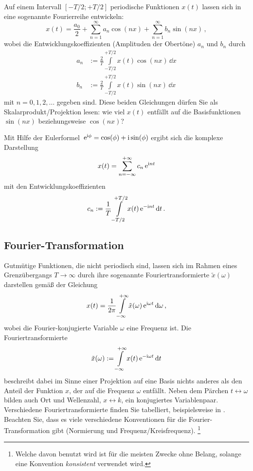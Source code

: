\documentclass[paper=a4, fontsize=11.0pt, abstractoff, DIV12]{scrartcl}
\begin{document}
Auf einem Intervall $[-T/2; +T/2]$ periodische Funktionen $x(t)$
lassen sich in eine sogenannte Fourierreihe entwickeln:
\begin{equation}
x(t) = \frac{a_0}{2}+\sum\limits_{n=1}^{\infty}a_n\cos(nx) + \sum\limits_{n=1}^{\infty}b_n\sin(nx)\,,
\end{equation}
wobei die Entwicklungskoeffizienten (Amplituden der \glqq Obertöne\grqq)
$a_n$ und $b_n$ durch
\begin{align}
a_n &:= \frac{2}{T}\int\limits_{-T/2}^{+T/2}x(t)\cos(nx)\,\dd x\\
b_n &:= \frac{2}{T}\int\limits_{-T/2}^{+T/2}x(t)\sin(nx)\,\dd x
\end{align}
mit $n=0,1,2,\dots$ gegeben sind. Diese beiden Gleichungen dürfen Sie als
Skalarprodukt/Projektion lesen: \glqq wie viel $x(t)$ entfällt auf die
Basisfunktionen $\sin(nx)$ beziehungsweise $\cos(nx)$?\grqq

Mit Hilfe der Eulerformel $\,{\mathrm{e}}^{\mathrm{i}\phi}=\cos(\phi)+\mathrm{i}\sin(\phi)$ ergibt
sich die komplexe Darstellung
\begin{equation}
x(t) = \sum\limits_{n=-\infty}^{+\infty}c_n\,{\mathrm{e}}^{\mathrm{i} n t}
\end{equation}
mit den Entwicklungskoeffizienten
\begin{equation}
c_n := \frac{1}{T}\int\limits_{-T/2}^{+T/2}x(t)\,{\mathrm{e}}^{-\mathrm{i} n t}\,\mathrm{d} t\,.
\end{equation}

\subsection{Fourier-Transformation}

Gutmütige Funktionen, die nicht periodisch sind, lassen sich im Rahmen eines
Grenzübergangs $T\to\infty$ durch ihre sogenannte Fouriertransformierte
$\tilde x(\omega)$ darstellen gemäß der Gleichung
\begin{equation}
x(t) = \frac{1}{2\pi}\int\limits_{-\infty}^{+\infty} \tilde x(\omega) \,{\mathrm{e}}^{\mathrm{i} \omega t}\,\mathrm{d}\omega\,,
\label{eq:IFT}
\end{equation}
wobei die Fourier-konjugierte Variable $\omega$ eine Frequenz ist. Die
Fouriertransformierte
\begin{equation}
\tilde x(\omega) := \int\limits_{-\infty}^{+\infty}x(t) \,{\mathrm{e}}^{-\mathrm{i} \omega t}\,\mathrm{d} t
\label{eq:FT}
\end{equation}
beschreibt dabei im Sinne einer Projektion auf eine Basis nichts anderes als
den Anteil der Funktion $x$, der auf die Frequenz $\omega$ entfällt. Neben
dem Pärchen $t \leftrightarrow \omega$ bilden auch Ort und Wellenzahl, $x
\leftrightarrow k$, ein konjugiertes Variablenpaar. Verschiedene
Fouriertransformierte finden Sie tabelliert, beispielsweise in \cite
{Gradshteyn}. Beachten Sie, dass es viele verschiedene Konventionen für die
Fourier-Transformation gibt (Normierung und Frequenz/Kreisfrequenz).
\footnote {Welche davon benutzt wird ist für die meisten Zwecke ohne Belang,
solange eine Konvention \emph{konsistent} verwendet wird.}
\end{document}
